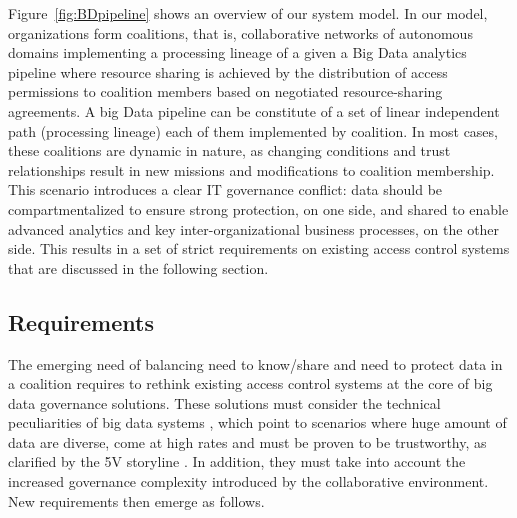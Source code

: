 Figure~\ref{fig:BDpipeline} shows an overview of our system model.
In our model, organizations form coalitions, that is, collaborative networks of autonomous domains implementing a processing lineage of a given a Big Data analytics pipeline where resource sharing is achieved by the distribution of access permissions to coalition members based on negotiated resource-sharing agreements. A big Data pipeline can be constitute of a set of linear independent path (processing lineage) each of them implemented by coalition. In most cases, these coalitions are dynamic in nature, as changing conditions and trust relationships result in new missions and modifications to coalition membership. This scenario introduces a clear IT governance conflict: data should be compartmentalized to ensure strong protection, on one side, and shared to enable advanced analytics and key inter-organizational business processes, on the other side. This results in a set of strict requirements on existing access control systems that are discussed in the following section.


\subsection{Requirements}\label{sec:accesscontrol_req}
The emerging need of balancing need to know/share and need to protect data in a coalition requires to rethink existing access control systems at the core of big data governance solutions. These solutions must consider the technical peculiarities of big data systems \cite{al2018exploring,aissa2020decide}, which point to scenarios where huge amount of data are diverse, come at high rates and must be proven to be trustworthy, as clarified by the 5V storyline \cite{5v}. In addition, they must take into account the increased governance complexity introduced by the collaborative environment. New  requirements then emerge as follows.
  
